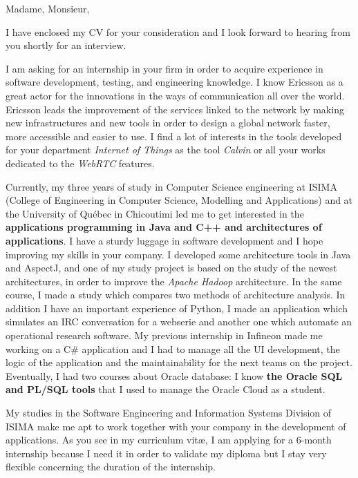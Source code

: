 
\date{\today}
\opening{Madame, Monsieur,}
\closing{I have enclosed my CV for your consideration and I look forward to hearing from you shortly for an interview.}

\makelettertitle

I am asking for an internship in your firm in order to acquire experience in software development, testing, and engineering knowledge. I know Ericsson as a great actor for the innovations in the ways of communication all over the world. Ericsson leads the improvement of the services linked to the network by making new infrastructures and new tools in order to design a global network faster, more accessible and easier to use. I find a lot of interests in the tools developed for your department \textit{Internet of Things} as the tool \textit{Calvin} or all your works dedicated to the \textit{WebRTC} features.

Currently, my three years of study in Computer Science engineering at ISIMA (College of Engineering in Computer Science, Modelling and Applications) and at the University of Québec in Chicoutimi led me to get interested in the \textbf{applications programming in Java and C++ and architectures of applications}. I have a sturdy luggage in software development and I hope improving my skills in your company. I developed some architecture tools in Java and AspectJ, and one of my study project is based on the study of the newest architectures, in order to improve the \textit{Apache Hadoop} architecture. In the same course, I made a study which compares two methods of architecture analysis. In addition I have an important experience of Python, I made an application which simulates an IRC conversation for a webserie and another one which automate an operational research software. My previous internship in Infineon made me working on a C\# application and I had to manage all the UI development, the logic of the application and the maintainability for the next teams on the project. Eventually, I had two courses about Oracle database: I know \textbf{the Oracle SQL and PL/SQL tools} that I used to manage the Oracle Cloud as a student.

My studies in the Software Engineering and Information Systems Division of ISIMA make me apt to work together with your company in the development of applications. As you see in my curriculum vit\ae{}, I am applying for a 6-month internship because I need it in order to validate my diploma but I stay very flexible concerning the duration of the internship.

\makeletterclosing
